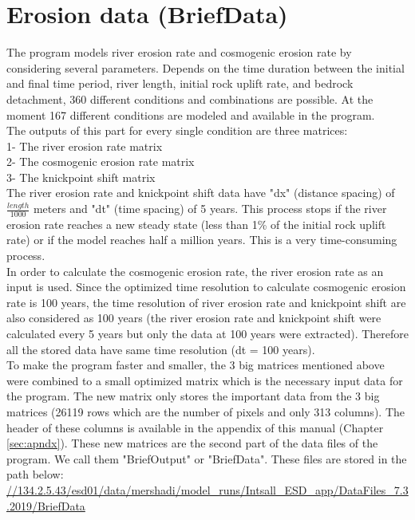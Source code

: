 \documentclass[11pt,a4paper,titlepage]{report}
\begin{document}
\section{Erosion data (BriefData)}

The program models river erosion rate and cosmogenic erosion rate by considering several parameters. Depends on the time duration between the initial and final time period, river length, initial rock uplift rate, and bedrock detachment, 360 different conditions and combinations are possible. At the moment 167 different conditions are modeled and available in the program.\\

The outputs of this part for every single condition are three matrices:\\
1- The river erosion rate matrix\\
2- The cosmogenic erosion rate matrix\\
3- The knickpoint shift matrix\\

The river erosion rate and knickpoint shift data have "dx" (distance spacing) of $\frac{length}{1000}$ meters and "dt" (time spacing) of 5 years. This process stops if the river erosion rate reaches a new steady state (less than 1\% of the initial rock uplift rate) or if the model reaches half a million years. This is a very time-consuming process.\\

In order to calculate the cosmogenic erosion rate, the river erosion rate as an input is used. Since the optimized time resolution to calculate cosmogenic erosion rate is 100 years, the time resolution of river erosion rate and knickpoint shift are also considered as 100 years (the river erosion rate and knickpoint shift were calculated every 5 years but only the data at 100 years were extracted). Therefore all the stored data have same time resolution (dt = 100 years).\\

To make the program faster and smaller, the 3 big matrices mentioned above were combined to a small optimized matrix which is the necessary input data for the program. The new matrix only stores the important data from the 3 big matrices (26119 rows which are the number of pixels and only 313 columns). The header of these columns is available in the appendix of this manual (Chapter \ref{sec:apndx}). These new matrices are the second part of the data files of the program. We call them "BriefOutput" or "BriefData". These files are stored in the path below:\\
\url{//134.2.5.43/esd01/data/mershadi/model_runs/Intsall_ESD_app/DataFiles_7.3.2019/BriefData}\\
\end{document}
